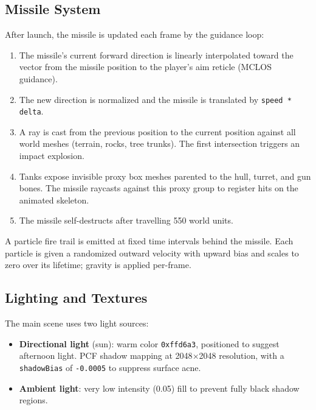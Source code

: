 \documentclass[11pt, a4paper]{article}
\begin{document}
	\subsection{Missile System}

	After launch, the missile is updated each frame by the guidance loop:

	\begin{enumerate}[itemsep=3pt]
		\item The missile's current forward direction is linearly interpolated toward the
		      vector from the missile position to the player's aim reticle (MCLOS guidance).
		\item The new direction is normalized and the missile is translated by
		      \texttt{speed * delta}.
		\item A ray is cast from the previous position to the current position against all
		      world meshes (terrain, rocks, tree trunks). The first intersection triggers an
		      impact explosion.
		\item Tanks expose invisible proxy box meshes parented to the hull, turret, and gun
		      bones. The missile raycasts against this proxy group to register hits on the
		      animated skeleton.
		\item The missile self-destructs after travelling 550 world units.
	\end{enumerate}

	A particle fire trail is emitted at fixed time intervals behind the missile. Each
	particle is given a randomized outward velocity with upward bias and scales to zero over
	its lifetime; gravity is applied per-frame.

	\subsection{Lighting and Textures}

	The main scene uses two light sources:

	\begin{itemize}[itemsep=3pt]
		\item \textbf{Directional light} (sun): warm color \texttt{0xffd6a3}, positioned
		      to suggest afternoon light. PCF shadow mapping at 2048$\times$2048 resolution,
		      with a \texttt{shadowBias} of \texttt{-0.0005} to suppress surface acne.
		\item \textbf{Ambient light}: very low intensity (0.05) fill to prevent fully
		      black shadow regions.
	\end{itemize}
\end{document}
